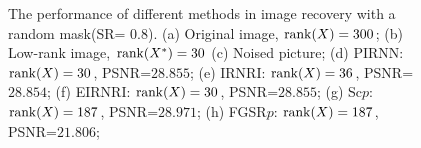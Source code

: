 \documentclass[twoside,11pt]{article}
\numberwithin{equation}{section}
\begin{document}
\begin{figure}[tbhp]
{    
  }
  \captionsetup{singlelinecheck=off, justification=raggedright}
  \caption{The performance of different methods in image recovery with a random mask(SR= $0.8$).
    (a) Original image, ${\rm rank}(X) = 300$; 
    (b) Low-rank image, ${\rm rank}(X^{*}) = 30$
    (c) Noised picture;
    (d) PIRNN:   ${\rm rank}(X) = 30$,  PSNR=$28.855$;
    (e) IRNRI:   ${\rm rank}(X) = 36$,  PSNR=$28.854$;   
    (f) EIRNRI:  ${\rm rank}(X) = 30$,  PSNR=$28.855$;    
    (g) Sc$p$:   ${\rm rank}(X) = 187$,  PSNR=$28.971$;   
    (h) FGSR$p$: ${\rm rank}(X) = 187$,  PSNR=$21.806$;   
  }
  \label{Relimg_Lena}
\end{figure}
\end{document}
